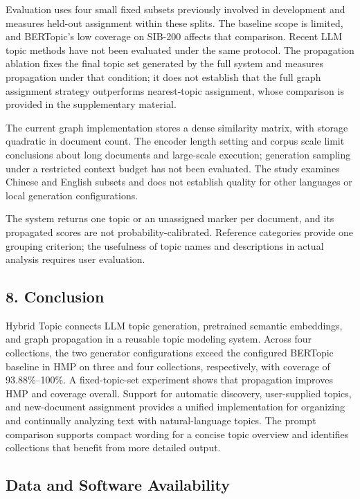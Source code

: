 \documentclass[
  11pt,
  a4paper,
]{article}
\begin{document}
Evaluation uses four small fixed subsets previously involved in
development and measures held-out assignment within these splits. The
baseline scope is limited, and BERTopic's low coverage on SIB-200
affects that comparison. Recent LLM topic methods have not been
evaluated under the same protocol. The propagation ablation fixes the
final topic set generated by the full system and measures propagation
under that condition; it does not establish that the full graph
assignment strategy outperforms nearest-topic assignment, whose
comparison is provided in the supplementary material.

The current graph implementation stores a dense similarity matrix, with
storage quadratic in document count. The encoder length setting and
corpus scale limit conclusions about long documents and large-scale
execution; generation sampling under a restricted context budget has not
been evaluated. The study examines Chinese and English subsets and does
not establish quality for other languages or local generation
configurations.

The system returns one topic or an unassigned marker per document, and
its propagated scores are not probability-calibrated. Reference
categories provide one grouping criterion; the usefulness of topic names
and descriptions in actual analysis requires user evaluation.

\subsection{8. Conclusion}\label{conclusion}

Hybrid Topic connects LLM topic generation, pretrained semantic
embeddings, and graph propagation in a reusable topic modeling system.
Across four collections, the two generator configurations exceed the
configured BERTopic baseline in HMP on three and four collections,
respectively, with coverage of 93.88\%--100\%. A fixed-topic-set
experiment shows that propagation improves HMP and coverage overall.
Support for automatic discovery, user-supplied topics, and new-document
assignment provides a unified implementation for organizing and
continually analyzing text with natural-language topics. The prompt
comparison supports compact wording for a concise topic overview and
identifies collections that benefit from more detailed output.

\subsection{Data and Software
Availability}\label{data-and-software-availability}
\end{document}
